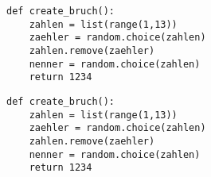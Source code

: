 \documentclass[a4paper,ngerman,12pt]{scrartcl}
\begin{document}
 
 
\begin{lstlisting}
def create_bruch():
    zahlen = list(range(1,13))
    zaehler = random.choice(zahlen)
    zahlen.remove(zaehler)
    nenner = random.choice(zahlen)
    return 1234
\end{lstlisting}
 
\begin{lstlisting}
def create_bruch():
    zahlen = list(range(1,13))
    zaehler = random.choice(zahlen)
    zahlen.remove(zaehler)
    nenner = random.choice(zahlen)
    return 1234
\end{lstlisting}

\clearpage


\end{document}

